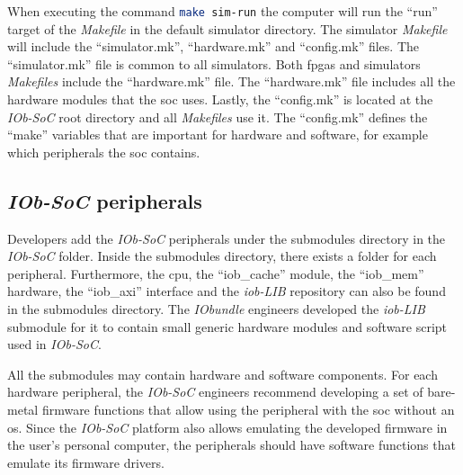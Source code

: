 When executing the command \lstinline[language=bash]{make sim-run} the computer will run the \enquote{run} target of the \textit{Makefile} in the default simulator directory. The simulator \textit{Makefile} will include the \enquote{simulator.mk}, \enquote{hardware.mk} and \enquote{config.mk} files. The \enquote{simulator.mk} file is common to all simulators. Both \acrshort{fpga}s and simulators \textit{Makefiles} include the \enquote{hardware.mk} file. The \enquote{hardware.mk} file includes all the hardware modules that the \acrshort{soc} uses. Lastly, the \enquote{config.mk} is located at the \textit{IOb-SoC} root directory and all \textit{Makefiles} use it. The \enquote{config.mk} defines the \enquote{make} variables that are important for hardware and software, for example which peripherals the \acrshort{soc} contains.

\subsection{\textit{IOb-SoC} peripherals}
Developers add the \textit{IOb-SoC} peripherals under the submodules directory in the \textit{IOb-SoC} folder. Inside the submodules directory, there exists a folder for each peripheral. Furthermore, the \acrshort{cpu}, the \enquote{iob\_cache} module, the \enquote{iob\_mem} hardware, the \enquote{iob\_axi} interface and the \textit{iob-LIB} repository can also be found in the submodules directory. The \textit{IObundle} engineers developed the \textit{iob-LIB} submodule for it to contain small generic hardware modules and software script used in \textit{IOb-SoC}.

All the submodules may contain hardware and software components. For each hardware peripheral, the \textit{IOb-SoC} engineers recommend developing a set of bare-metal firmware functions that allow using the peripheral with the \acrshort{soc} without an \acrshort{os}. Since the \textit{IOb-SoC} platform also allows emulating the developed firmware in the user's personal computer, the peripherals should have software functions that emulate its firmware drivers.

